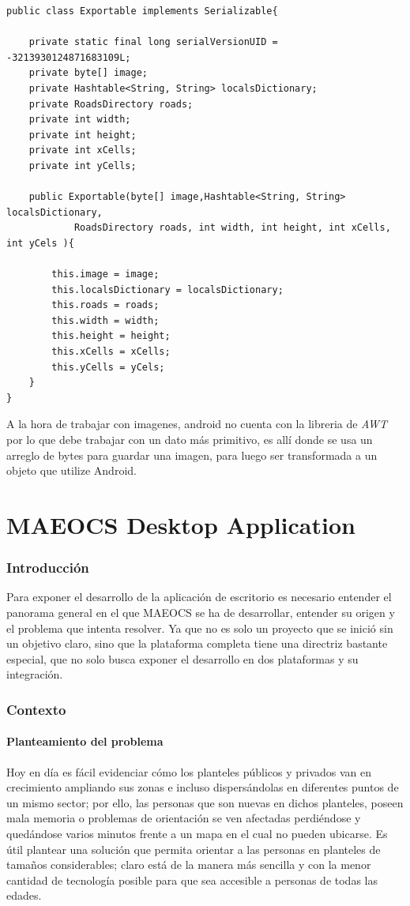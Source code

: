 \documentclass[11pt]{book}
\begin{document}
\begin{lstlisting}
public class Exportable implements Serializable{

	private static final long serialVersionUID = -3213930124871683109L;
	private byte[] image;
	private Hashtable<String, String> localsDictionary;
	private RoadsDirectory roads;
	private int width;
	private int height;
	private int xCells;
	private int yCells;

	public Exportable(byte[] image,Hashtable<String, String> localsDictionary,
			RoadsDirectory roads, int width, int height, int xCells, int yCels ){
		
		this.image = image;
		this.localsDictionary = localsDictionary;
		this.roads = roads;
		this.width = width;
		this.height = height;
		this.xCells = xCells;
		this.yCells = yCels;	
	}
}
\end{lstlisting}
A la hora de trabajar con imagenes, android no cuenta con la libreria de \emph{AWT}  por lo que debe trabajar con un dato más primitivo, es allí donde se usa un arreglo de bytes para guardar una imagen, para luego ser transformada a un objeto que utilize Android.


\part{MAEOCS Desktop Application}
\section{Introducción}
Para exponer el desarrollo de la aplicación de escritorio es necesario entender el panorama general en el que MAEOCS se ha de desarrollar, entender su origen y el problema que intenta resolver. Ya que no es solo un proyecto que se inició sin un objetivo claro, sino que la plataforma completa tiene una directriz bastante especial, que no solo busca exponer el desarrollo en dos plataformas y su integración.
\section{Contexto}
\subsection{Planteamiento del problema}
Hoy en día es fácil evidenciar cómo los planteles públicos y privados van en crecimiento ampliando sus zonas e incluso dispersándolas en diferentes puntos de un mismo sector; por ello, las personas que son nuevas en dichos planteles, poseen mala memoria o problemas de orientación se ven afectadas perdiéndose y quedándose varios minutos frente a un mapa en el cual no pueden ubicarse.
Es útil plantear una solución que permita orientar a las personas en planteles de tamaños considerables; claro está de la manera más sencilla y con la menor cantidad de tecnología posible para que sea accesible a personas de todas las edades.
\end{document}
